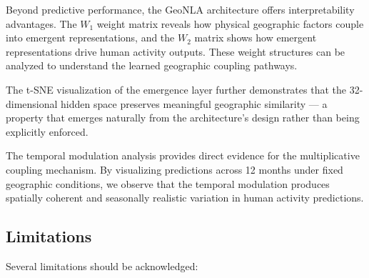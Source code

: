 \documentclass[a4paper,11pt]{article}
\begin{document}
Beyond predictive performance, the GeoNLA architecture offers interpretability advantages. The $W_1$ weight matrix reveals how physical geographic factors couple into emergent representations, and the $W_2$ matrix shows how emergent representations drive human activity outputs. These weight structures can be analyzed to understand the learned geographic coupling pathways.

The t-SNE visualization of the emergence layer further demonstrates that the 32-dimensional hidden space preserves meaningful geographic similarity --- a property that emerges naturally from the architecture's design rather than being explicitly enforced.

The temporal modulation analysis provides direct evidence for the multiplicative coupling mechanism. By visualizing predictions across 12 months under fixed geographic conditions, we observe that the temporal modulation produces spatially coherent and seasonally realistic variation in human activity predictions.

\subsection{Limitations}
\label{subsec:limitations}

Several limitations should be acknowledged:
\end{document}
